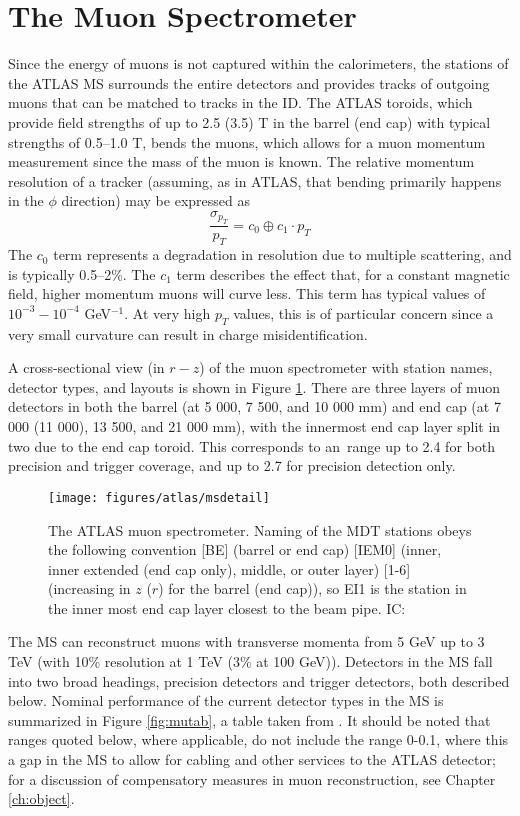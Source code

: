 \section{The Muon Spectrometer}
Since the energy of muons is not captured within the calorimeters, the stations of the ATLAS MS surrounds the entire detectors and provides tracks of outgoing muons that can be matched to tracks in the ID.  The ATLAS toroids, which provide field strengths of up to 2.5 (3.5) T in the barrel (end cap) with typical strengths of 0.5--1.0 T, bends the muons, which allows for a muon momentum measurement since the mass of the muon is known.  The relative momentum resolution of a tracker (assuming, as in ATLAS, that bending primarily happens in the $\phi$ direction) may be expressed as
\begin{equation}
\frac{\sigma_{p_T}}{p_T}=c_0\oplus c_1\cdot p_T
\label{eqn:ptres}
\end{equation}
The $c_0$ term represents a degradation in resolution due to multiple scattering, and is typically 0.5--2\%\cite{tully}.  The $c_1$ term describes the effect that, for a constant magnetic field, higher momentum muons will curve less.  This term has typical values of $10^{-3}-10^{-4}$ GeV$^{-1}$.  At very high $p_T$ values, this is of particular concern since a very small curvature can result in charge misidentification.

A cross-sectional view (in $r-z$) of the muon spectrometer with station names, detector types, and layouts is shown in Figure \ref{fig:ms}.  There are three layers of muon detectors in both the barrel (at 5 000, 7 500, and 10 000 mm) and end cap (at 7 000 (11 000), 13 500, and 21 000 mm), with the innermost end cap layer split in two due to the end cap toroid.  This corresponds to an \aeta\,range up to 2.4 for both precision and trigger coverage, and up to 2.7 for precision detection only.  
\begin{figure}[!htbp]\captionsetup{justification=centering}
  \centering
  \texttt{[image: figures/atlas/msdetail]}
  \caption{The ATLAS muon spectrometer.  Naming of the MDT stations obeys the following convention [BE] (barrel or end cap) [IEM0] (inner, inner extended (end cap only), middle, or outer layer) [1-6] (increasing in $z$ ($r$) for the barrel (end cap)), so EI1 is the station in the inner most end cap layer closest to the beam pipe.  IC: \cite{jinstpaper}}
  \label{fig:ms}
\end{figure}

The MS can reconstruct muons with transverse momenta from 5 GeV up to 3 TeV (with 10\% resolution at 1 TeV (3\% at 100 GeV)).  Detectors in the MS fall into two broad headings, precision detectors and trigger detectors, both described below.  Nominal performance of the current detector types in the MS is summarized in Figure \ref{fig:mutab}, a table taken from \cite{jinstpaper}.  It should be noted that \aeta\, ranges quoted below, where applicable, do not include the range 0-0.1, where this a gap in the MS to allow for cabling and other services to the ATLAS detector; for a discussion of compensatory measures in muon reconstruction, see Chapter \ref{ch:object}.

